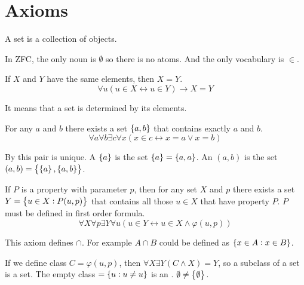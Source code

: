 \section{Axioms}

\begin{definition}
    A set is a collection of objects.
\end{definition}

In ZFC, the only noun is $\emptyset$ so there is no atoms. And the only vocabulary is $\in$.

\begin{axiom}\label{axiomofextensionality}
    If $X$ and $Y$ have the same elements, then $X=Y$.
    \begin{equation}
        \forall u (u \in X \leftrightarrow u \in Y ) \rightarrow X = Y
    \end{equation}
\end{axiom}

It means that a set is determined by its elements.

\begin{axiom}
    For any $a$ and $b$ there exists a set $\set{a,b}$ that contains exactly $a$ and $b$.
    \begin{equation}
        \forall a \forall b \exists c \forall x (x \in c \leftrightarrow x = a \vee x = b )
    \end{equation}
\end{axiom}
By  this pair is unique. A  $\set{a}$ is the set $\set{a} = \set{a, a}$. An  $(a,b)$ is the set $(a,b) = \set{\set{a}, \set{a,b}}$.


\begin{axiom}
    If $P$ is a property with parameter $p$, then for any set $X$ and $p$ there exists a set $Y = \set{u \in X: P(u,p)}$ that contains all those $u \in X$ that have property $P$. $P$ must be defined in first order formula.
    \begin{equation}
        \forall X \forall p \exists Y \forall u \left(u \in Y \leftrightarrow u \in X \wedge \varphi(u, p) \right)
    \end{equation}    
\end{axiom}

This axiom defines $\cap$. For example $A \cap B$ could be defined as $\set{x \in A: x \in B}$.


If we define class $C = \varphi(u, p)$, then $\forall X \exists Y (C \wedge X )= Y$, so a subclass of a set is a set. The empty class \cindex{$\emptyset$} $ = \set{u: u \neq u} $ is an . $\emptyset \neq \set{\emptyset}$.

